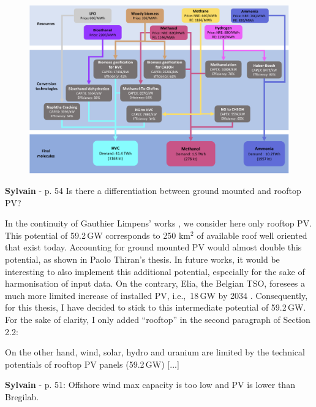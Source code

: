 \documentclass[12pt,a4paper]{article}
\def\ie{i.e.,\ }
\begin{document}
\begin{figure}[htbp!]
\centering
\includegraphics[width=\textwidth]{NED_tech.pdf}
\label{fig:NED_tech}
\end{figure}

\begin{mdframed}[style=comment] %
{\color{purple} \textbf{Sylvain}} - p. 54 Is there a differentiation between ground mounted and rooftop PV?
\end{mdframed}

\noindent In the continuity of Gauthier Limpens' works \cite{limpens2021generating}, we consider here only rooftop PV. This potential of 59.2\,GW corresponds to 250 km$^2$ of available roof well oriented that exist today. Accounting for ground mounted PV would almost double this potential, as shown in Paolo Thiran's thesis. In future works, it would be interesting to also implement this additional potential, especially for the sake of harmonisation of input data. On the contrary, Elia, the Belgian TSO, foresees a much more limited increase of installed PV, \ie 18\,GW by 2034 \cite{Elia_2024_2034}. Consequently, for this thesis, I have decided to stick to this intermediate potential of 59.2\,GW. For the sake of clarity, I only added ``rooftop'' {\color{blue}in the second paragraph of Section 2.2}:

\begin{mdframed}[style=manuscript] %
On the other hand, wind, solar, hydro and uranium are limited by the technical potentials of rooftop PV panels (59.2\,GW) [...]
\end{mdframed}

\begin{mdframed}[style=comment] %
{\color{purple} \textbf{Sylvain}} - p. 51: Offshore wind max capacity is too low and PV is lower than Bregilab.
\end{mdframed}
\end{document}
